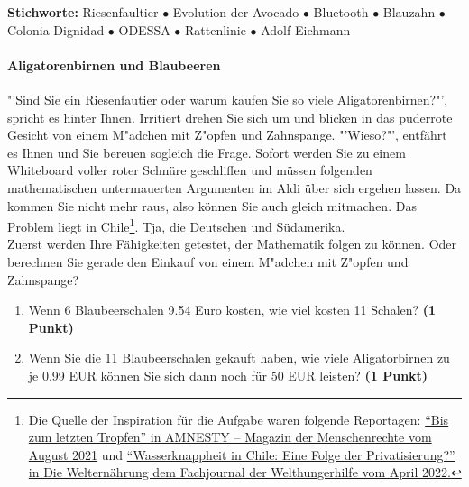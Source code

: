 \documentclass[a4paper, 9pt]{scrartcl}\usepackage[]{graphicx}\usepackage[]{xcolor}
\begin{document}
{\tiny\textbf{Stichworte:} Riesenfaultier $\bullet$ Evolution der Avocado $\bullet$ Bluetooth $ \bullet$ Blauzahn $\bullet$ Colonia Dignidad $\bullet$ ODESSA $\bullet$ Rattenlinie $\bullet$ Adolf Eichmann}


\paragraph{Aligatorenbirnen und Blaubeeren}



"'Sind Sie ein Riesenfautier oder warum kaufen Sie so viele
Aligatorenbirnen?"', spricht es hinter Ihnen. Irritiert drehen Sie sich um
und blicken in das puderrote Gesicht von einem M{"a}dchen mit Z{"o}pfen und Zahnspange. "'Wieso?"', entfährt es
Ihnen und Sie bereuen sogleich die Frage. Sofort werden Sie zu einem
Whiteboard voller roter Schnüre geschliffen und müssen folgenden
mathematischen untermauerten Argumenten im Aldi über sich ergehen
lassen. Da kommen Sie nicht mehr raus, also können Sie auch gleich
mitmachen. Das Problem liegt in Chile\footnote{Die Quelle der Inspiration
  für die Aufgabe waren folgende Reportagen:
  \href{https://www.amnesty.ch/de/ueber-amnesty/publikationen/magazin-amnesty/2021-3/bis-zum-letzten-tropfen}{"`Bis
  zum letzten Tropfen"' in AMNESTY – Magazin der Menschenrechte vom August
  2021} und
\href{https://www.welthungerhilfe.de/welternaehrung/rubriken/klima-ressourcen/wassernot-in-chile-eine-folge-der-privatisierung}{"`Wasserknappheit
  in Chile: Eine Folge der Privatisierung?"' in Die Welternährung dem
  Fachjournal der Welthungerhilfe vom April 2022.}}. Tja, die Deutschen und Südamerika.\\

Zuerst werden Ihre Fähigkeiten getestet, der Mathematik folgen zu können. Oder berechnen Sie gerade den Einkauf von einem M{"a}dchen mit Z{"o}pfen und Zahnspange?\\

\begin{enumerate}
\item Wenn 6 Blaubeerschalen 9.54 Euro kosten,  wie viel kosten 11 Schalen? \textbf{(1 Punkt)}
\item Wenn Sie die 11 Blaubeerschalen gekauft haben, wie viele Aligatorbirnen zu je 0.99 EUR können Sie sich dann noch für 50 EUR leisten? \textbf{(1 Punkt)}
\end{enumerate}
\end{document}
